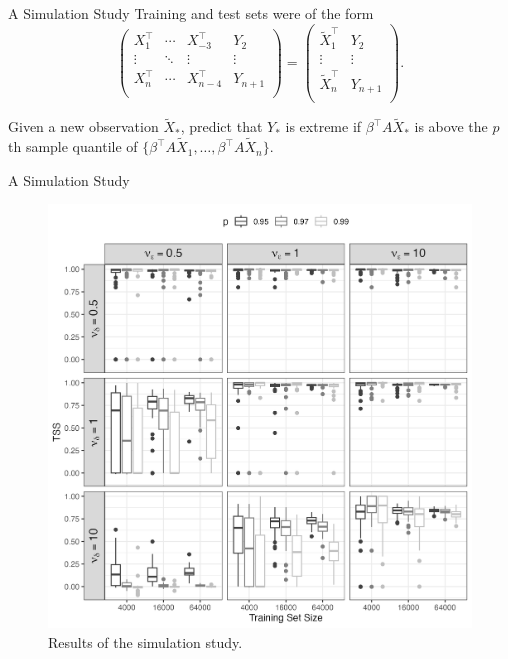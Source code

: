 \documentclass{beamer}
\begin{document}
\begin{frame}{A Simulation Study}
    Training and test sets were of the form
    \[
    \left(
    \begin{matrix}
    X_1^{\top} & \cdots & X_{-3}^{\top} & Y_2 \\
    \vdots & \ddots & \vdots & \vdots \\
    X_n^{\top} & \cdots & X_{n - 4}^{\top} & Y_{n + 1} \\
    \end{matrix}
    \right)
    =
    \left(
    \begin{matrix}
    \tilde{X}_1^{\top} & Y_2 \\
    \vdots & \vdots \\
    \tilde{X}_n^{\top} & Y_{n + 1} \\
    \end{matrix}
    \right).
    \]

    Given a new observation $\tilde{X}_*$, predict that $Y_*$ is extreme if $\beta^{\top} A\tilde{X}_*$ is above the $p$th sample quantile of $\{\beta^{\top} A\tilde{X}_1, \ldots, \beta^{\top} A\tilde{X}_n\}$.
\end{frame}

\begin{frame}{A Simulation Study}
    \begin{figure}[h!]
        \centering
        \includegraphics[scale=0.4]{sim_study07.png}
        \caption{Results of the simulation study.}
        \label{fig:sim_study07}
    \end{figure}
\end{frame}
\end{document}
